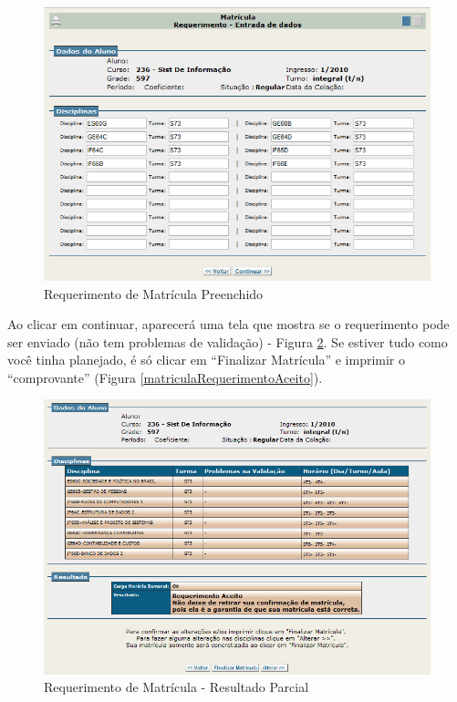 \documentclass[a4paper,12pt,openany]{article}
\begin{document}
	\begin{figure}[ht!]  \centering
		\includegraphics[scale=0.5]{Matricula_Requerimento_Preenchido.png}
		\caption{Requerimento de Matrícula Preenchido}
		\label{matriculaRequerimentoPreenchido}
	\end{figure}

Ao clicar em continuar, aparecerá uma tela que mostra se o requerimento pode ser enviado (não tem problemas de validação) - Figura \ref{matriculaRequerimentoResultadoParcial}. Se estiver tudo como você tinha planejado, é só clicar em ``Finalizar Matrícula'' e imprimir o ``comprovante'' (Figura \ref{matriculaRequerimentoAceito}).

	\begin{figure}[ht!]  \centering
		\includegraphics[scale=0.5]{Matricula_Requerimento_Resultado_Parcial.png}
		\caption{Requerimento de Matrícula - Resultado Parcial}
		\label{matriculaRequerimentoResultadoParcial}
	\end{figure}
\end{document}
